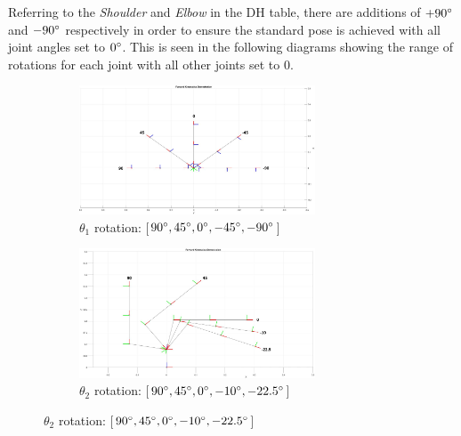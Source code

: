 \documentclass[9pt, a4paper]{article}
\begin{document}
Referring to the \textit{Shoulder} and \textit{Elbow} in the DH table, there are
additions of $+90 \degree$ and $-90 \degree$ respectively in order to ensure the
standard pose \cite{CAD_model} is achieved with all joint angles set to $0
\degree$. This is seen in the following diagrams showing the range of rotations
for each joint with all other joints set to 0.
\begin{figure}[h]
  \centering
  \begin{subfigure}{.5\textwidth}
    \centering
    \includegraphics[width=7cm]{theta1.JPG}
    \caption{$\theta_1$ rotation: [$90\degree, 45\degree, 0\degree, -45\degree, -90\degree$]}
  \end{subfigure}%
  \begin{subfigure}{.5\textwidth}
    \centering
    \includegraphics[width=7cm]{theta2.JPG}
    \caption{$\theta_2$ rotation: [$90\degree, 45\degree, 0\degree, -10\degree, -22.5\degree$]}
  \end{subfigure}
\end{figure}
\end{document}
